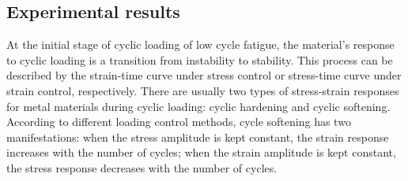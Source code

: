 \subsection{Experimental results}
\noindent
At the initial stage of cyclic loading of low cycle fatigue, the material's response to cyclic loading is a transition from instability to stability.
This process can be described by the strain-time curve under stress control or stress-time curve under strain control, respectively.
There are usually two types of stress-strain responses for metal materials during cyclic loading: cyclic hardening and cyclic softening.
According to different loading control methods, cycle softening has two manifestations: when the stress amplitude is kept constant, the strain response increases with the number of cycles; when the strain amplitude is kept constant, the stress response decreases with the number of cycles.

